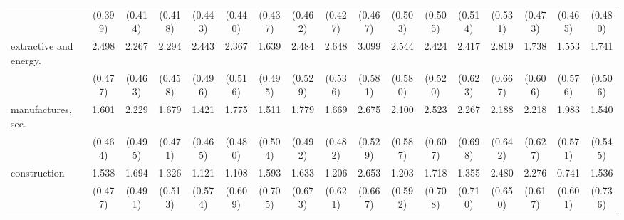 {\begin{tabular}{l*{16}{c}}
                    &     (0.399)         &     (0.414)         &     (0.418)         &     (0.443)         &     (0.440)         &     (0.437)         &     (0.462)         &     (0.427)         &     (0.467)         &     (0.503)         &     (0.505)         &     (0.514)         &     (0.531)         &     (0.473)         &     (0.465)         &     (0.480)         \\
[1em]
extractive and energy.&       2.498\sym{***}&       2.267\sym{***}&       2.294\sym{***}&       2.443\sym{***}&       2.367\sym{***}&       1.639\sym{***}&       2.484\sym{***}&       2.648\sym{***}&       3.099\sym{***}&       2.544\sym{***}&       2.424\sym{***}&       2.417\sym{***}&       2.819\sym{***}&       1.738\sym{**} &       1.553\sym{**} &       1.741\sym{***}\\
                    &     (0.477)         &     (0.463)         &     (0.458)         &     (0.496)         &     (0.516)         &     (0.495)         &     (0.529)         &     (0.536)         &     (0.581)         &     (0.580)         &     (0.520)         &     (0.623)         &     (0.667)         &     (0.606)         &     (0.576)         &     (0.506)         \\
[1em]
manufactures, sec.  &       1.601\sym{***}&       2.229\sym{***}&       1.679\sym{***}&       1.421\sym{**} &       1.775\sym{***}&       1.511\sym{**} &       1.779\sym{***}&       1.669\sym{***}&       2.675\sym{***}&       2.100\sym{***}&       2.523\sym{***}&       2.267\sym{**} &       2.188\sym{***}&       2.218\sym{***}&       1.983\sym{***}&       1.540\sym{**} \\
                    &     (0.464)         &     (0.495)         &     (0.471)         &     (0.465)         &     (0.480)         &     (0.504)         &     (0.492)         &     (0.482)         &     (0.529)         &     (0.587)         &     (0.607)         &     (0.698)         &     (0.642)         &     (0.627)         &     (0.571)         &     (0.545)         \\
[1em]
construction        &       1.538\sym{**} &       1.694\sym{***}&       1.326\sym{**} &       1.121         &       1.108         &       1.593\sym{*}  &       1.633\sym{*}  &       1.206         &       2.653\sym{***}&       1.203\sym{*}  &       1.718\sym{*}  &       1.355         &       2.480\sym{***}&       2.276\sym{***}&       0.741         &       1.536\sym{*}  \\
                    &     (0.477)         &     (0.491)         &     (0.513)         &     (0.574)         &     (0.609)         &     (0.705)         &     (0.673)         &     (0.621)         &     (0.667)         &     (0.592)         &     (0.708)         &     (0.710)         &     (0.650)         &     (0.617)         &     (0.601)         &     (0.736)         \\

\end{tabular}}
